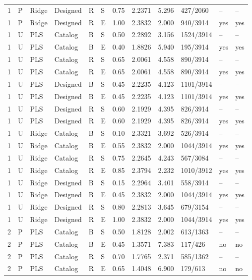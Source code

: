 \documentclass[10pt,a4paper]{article}
\begin{document}
\begin{longtable}{rlllllrrrlll}
1 & P & Ridge & Designed & R & S & 0.75 & 2.2371 & 5.296 & 427/2060 & -- & -- \\
1 & P & Ridge & Designed & R & E & 1.00 & 2.3832 & 2.000 & 940/3914 & yes & yes \\
1 & U & PLS & Catalog & B & S & 0.50 & 2.2892 & 3.156 & 1524/3914 & -- & -- \\
1 & U & PLS & Catalog & B & E & 0.40 & 1.8826 & 5.940 & 195/3914 & yes & yes \\
1 & U & PLS & Catalog & R & S & 0.65 & 2.0061 & 4.558 & 890/3914 & -- & -- \\
1 & U & PLS & Catalog & R & E & 0.65 & 2.0061 & 4.558 & 890/3914 & yes & yes \\
1 & U & PLS & Designed & B & S & 0.45 & 2.2235 & 4.123 & 1101/3914 & -- & -- \\
1 & U & PLS & Designed & B & E & 0.45 & 2.2235 & 4.123 & 1101/3914 & yes & yes \\
1 & U & PLS & Designed & R & S & 0.60 & 2.1929 & 4.395 & 826/3914 & -- & -- \\
1 & U & PLS & Designed & R & E & 0.60 & 2.1929 & 4.395 & 826/3914 & yes & yes \\
1 & U & Ridge & Catalog & B & S & 0.10 & 2.3321 & 3.692 & 526/3914 & -- & -- \\
1 & U & Ridge & Catalog & B & E & 0.55 & 2.3832 & 2.000 & 1044/3914 & yes & yes \\
1 & U & Ridge & Catalog & R & S & 0.75 & 2.2645 & 4.243 & 567/3084 & -- & -- \\
1 & U & Ridge & Catalog & R & E & 0.85 & 2.3794 & 2.232 & 1010/3912 & yes & yes \\
1 & U & Ridge & Designed & B & S & 0.15 & 2.2964 & 3.401 & 558/3914 & -- & -- \\
1 & U & Ridge & Designed & B & E & 0.45 & 2.3832 & 2.000 & 1044/3914 & yes & yes \\
1 & U & Ridge & Designed & R & S & 0.80 & 2.2813 & 3.645 & 679/3154 & -- & -- \\
1 & U & Ridge & Designed & R & E & 1.00 & 2.3832 & 2.000 & 1044/3914 & yes & yes \\
2 & P & PLS & Catalog & B & S & 0.50 & 1.8128 & 2.002 & 613/1363 & -- & -- \\
2 & P & PLS & Catalog & B & E & 0.45 & 1.3571 & 7.383 & 117/426 & no & no \\
2 & P & PLS & Catalog & R & S & 0.70 & 1.7765 & 2.371 & 585/1362 & -- & -- \\
2 & P & PLS & Catalog & R & E & 0.65 & 1.4048 & 6.900 & 179/613 & no & no \\

\end{longtable}
\end{document}
